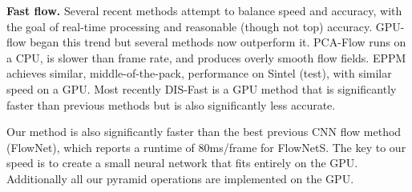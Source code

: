 \documentclass[10pt,twocolumn,letterpaper]{article}
\begin{document}


{\bf Fast flow.} Several recent methods attempt to balance speed and accuracy, with the goal of real-time processing and reasonable (though not top) accuracy.
GPU-flow \cite{Werlberger2009:GPUflow} began this trend but several methods now outperform it.
PCA-Flow \cite{wulff2015efficient} runs on a CPU, is slower than frame rate, and produces overly smooth flow fields.
EPPM \cite{bao2014tipeppm} achieves similar, middle-of-the-pack, performance on Sintel (test), with similar speed on a GPU.
Most recently DIS-Fast \cite{Kroeger:ECCV:2016} is a GPU method that is significantly faster than previous methods but is also significantly less accurate.

Our method is also significantly faster than the best previous CNN flow method (FlowNet), which reports a runtime of 80ms/frame for FlowNetS. 
The key to our speed is to create a small neural network that fits entirely on the GPU. 
Additionally all our pyramid operations are implemented on the GPU.
\end{document}

